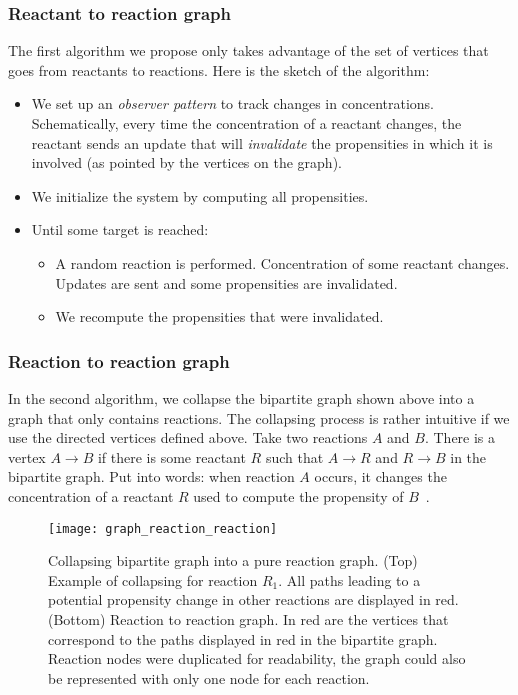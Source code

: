 \subsubsection{Reactant to reaction graph}

The first algorithm we propose only takes advantage of the set of vertices that goes from reactants to reactions. Here is the sketch of the algorithm:
\begin{itemize}
  \item We set up an \emph{observer pattern} to track changes in concentrations. Schematically, every time the concentration of a reactant changes, the reactant sends an update that will \emph{invalidate} the propensities in which it is involved (as pointed by the vertices on the graph).
  \item We initialize the system by computing all propensities.
  \item Until some target is reached:
    \begin{itemize}
      \item A random reaction is performed. Concentration of some reactant changes. Updates are sent and some propensities are invalidated.
      \item We recompute the propensities that were invalidated.
    \end{itemize}
\end{itemize}

\subsubsection{Reaction to reaction graph}

In the second algorithm, we collapse the bipartite graph shown above into a graph that only contains reactions. The collapsing process is rather intuitive if we use the directed vertices defined above. Take two reactions $A$ and $B$. There is a vertex $A \rightarrow B$ if there is some reactant $R$ such that $A \rightarrow R$ and $R \rightarrow B$ in the bipartite graph. Put into words: when reaction $A$ occurs, it changes the concentration of a reactant $R$ used to compute the propensity of $B$~. 

\begin{figure}[!ht]
  \centering
  \texttt{[image: graph\_reaction\_reaction]}
  \caption{Collapsing bipartite graph into a pure reaction graph. (Top) Example of collapsing for reaction $R_1$. All paths leading to a potential propensity change in other reactions are displayed in red. (Bottom) Reaction to reaction graph. In red are the vertices that correspond to the paths displayed in red in the bipartite graph. Reaction nodes were duplicated for readability, the graph could also be represented with only one node for each reaction.}
  \label{fig:reaction_reaction_graph}
\end{figure}

